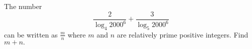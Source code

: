 The number \[ \frac 2{\log_4{2000^6}}+\frac 3{\log_5{2000^6}} \] can be written as $\frac mn$ where $m$ and $n$ are relatively prime positive integers.  Find $m+n.$